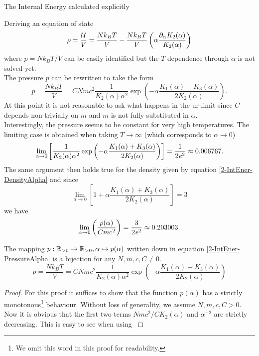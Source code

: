 \begin{section}{The Internal Energy calculated explicitly}
\begin{subsection}{Deriving an equation of state}
\begin{equation}
	\rho = \frac{\mathcal{U}}{V} = \frac{Nk_BT}{V} - \frac{Nk_BT}{V}\left(\alpha\frac{\partial_\alpha K_2(\alpha)}{K_2(\alpha)}\right)
	\label{2-IntEner-DensityAlpha}
\end{equation}
where $p=Nk_BT/V$ can be easily identified but the $T$ dependence through $\alpha$ is not solved yet.\\
The pressure $p$ can be rewritten to take the form
\begin{equation}
	p = \frac{Nk_BT}{V} = CNmc^2\frac{1}{K_2(\alpha)\alpha^2}\exp\left(-\alpha\frac{K_1(\alpha)+K_3(\alpha)}{2K_2(\alpha)}\right).
	\label{2-IntEner-PressureAlpha}
\end{equation}
At this point it is not reasonable to ask what happens in the ur-limit since $C$ depends non-trivially on $m$ and $m$ is not fully substituted in $\alpha$.\\
Interestingly, the pressure seems to be constant for very high temperatures. The limiting case is obtained when taking $T\rightarrow\infty$ (which corresponds to $\alpha\rightarrow0$)
\begin{equation}
	\lim\limits_{\alpha\to0}\left[\frac{1}{K_2(\alpha)\alpha^2}\exp\left(-\alpha\frac{K_1(\alpha)+K_3(\alpha)}{2K_2(\alpha)}\right)\right] = \frac{1}{2\mathit{e}^2} \approx 0.006767.
\end{equation}
The same argument then holds true for the density given by equation \ref{2-IntEner-DensityAlpha} and since 
\begin{equation}
	\lim\limits_{\alpha\to0}\left[1+\alpha\frac{K_1(\alpha)+K_3(\alpha)}{2K_2(\alpha)}\right] = 3
\end{equation}
we have
\begin{equation}
	\lim\limits_{\alpha\to0}\left(\frac{\rho(\alpha)}{Cmc^2}\right) = \frac{3}{2\mathit{e}^2} \approx 0.203003.
\end{equation}
%
%
\begin{theorem}
	The mapping $p:\mathbb{R}_{>0}\rightarrow \mathbb{R}_{>0},\alpha\mapsto p(\alpha)$ written down in equation \eqref{2-IntEner-PressureAlpha} is a bijection for any $N,m,c,C\neq0$.
	\begin{equation}
		p = \frac{Nk_BT}{V} = CNmc^2\frac{1}{K_2(\alpha)\alpha^2}\exp\left(-\alpha\frac{K_1(\alpha)+K_3(\alpha)}{2K_2(\alpha)}\right)
	\end{equation}
\end{theorem}
\begin{proof}
	For this proof it suffices to show that the function $p(\alpha)$ has a strictly monotonous\footnote{We omit this word in this proof for readability.} behaviour. Without loss of generality, we assume $N,m,c,C>0$. Now it is obvious that the first two terms $Nmc^2/CK_2(\alpha)$ and $\alpha^{-2}$ are strictly decreasing. This is easy to see when using \cite{ModifiedBesselFunction}

\end{proof}
\end{subsection}
\end{section}
